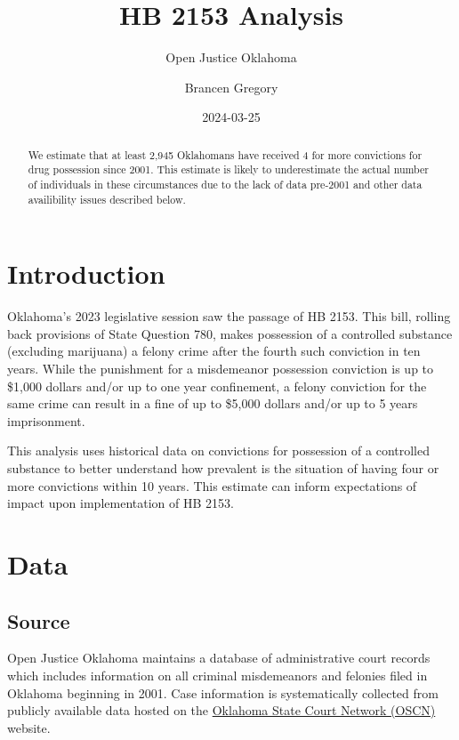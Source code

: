 \documentclass[
  letterpaper,
  DIV=11,
  numbers=noendperiod]{scrartcl}
\title{HB 2153 Analysis}
\subtitle{Open Justice Oklahoma}
\author{Brancen Gregory}
\date{2024-03-25}
\begin{document}
\maketitle
\begin{abstract}
We estimate that at least 2,945 Oklahomans have received 4 for more
convictions for drug possession since 2001. This estimate is likely to
underestimate the actual number of individuals in these circumstances
due to the lack of data pre-2001 and other data availibility issues
described below.
\end{abstract}
\ifdefined\Shaded\renewenvironment{Shaded}{\begin{tcolorbox}[sharp corners, borderline west={3pt}{0pt}{shadecolor}, frame hidden, interior hidden, breakable, enhanced, boxrule=0pt]}{\end{tcolorbox}}\fi

\hypertarget{introduction}{%
\section{Introduction}\label{introduction}}

Oklahoma's 2023 legislative session saw the passage of HB 2153. This
bill, rolling back provisions of State Question 780, makes possession of
a controlled substance (excluding marijuana) a felony crime after the
fourth such conviction in ten years. While the punishment for a
misdemeanor possession conviction is up to \$1,000 dollars and/or up to
one year confinement, a felony conviction for the same crime can result
in a fine of up to \$5,000 dollars and/or up to 5 years imprisonment.

This analysis uses historical data on convictions for possession of a
controlled substance to better understand how prevalent is the situation
of having four or more convictions within 10 years. This estimate can
inform expectations of impact upon implementation of HB 2153.

\hypertarget{data}{%
\section{Data}\label{data}}

\hypertarget{source}{%
\subsection{Source}\label{source}}

Open Justice Oklahoma maintains a database of administrative court
records which includes information on all criminal misdemeanors and
felonies filed in Oklahoma beginning in 2001. Case information is
systematically collected from publicly available data hosted on the
\href{https://www.oscn.net/v4/}{Oklahoma State Court Network (OSCN)}
website.
\end{document}
